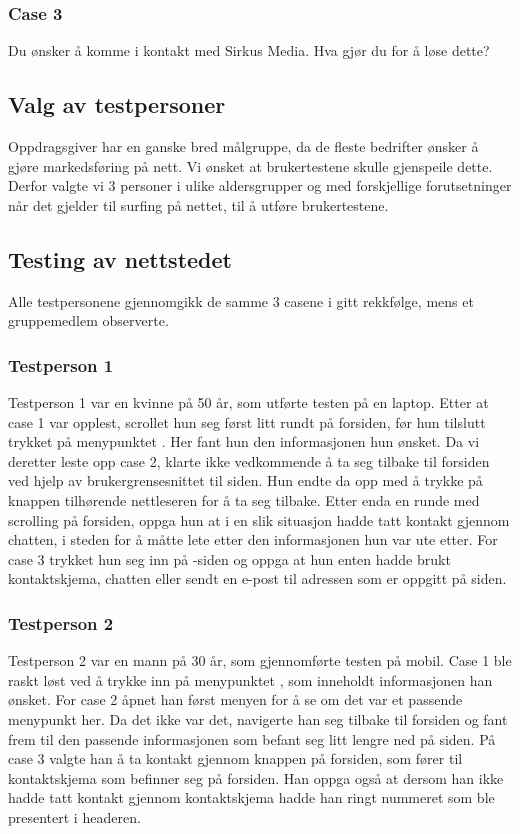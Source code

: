 \subsubsection{Case 3}
Du ønsker å komme i kontakt med Sirkus Media. Hva gjør du for å løse dette?

\subsection{Valg av testpersoner }
Oppdragsgiver har en ganske bred målgruppe, da de fleste bedrifter ønsker å gjøre markedsføring på nett. Vi ønsket at brukertestene skulle gjenspeile dette. Derfor valgte vi 3 personer i ulike aldersgrupper og med forskjellige forutsetninger når det gjelder til surfing på nettet, til å utføre brukertestene.

\subsection{Testing av nettstedet}
Alle testpersonene gjennomgikk de samme 3 casene i gitt rekkfølge, mens et gruppemedlem observerte.

\subsubsection{Testperson 1}
Testperson 1 var en kvinne på 50 år, som utførte testen på en laptop. Etter at case 1 var opplest, scrollet hun seg først litt rundt på forsiden, før hun tilslutt trykket på menypunktet . Her fant hun den informasjonen hun ønsket. Da vi deretter leste opp case 2, klarte ikke vedkommende å ta seg tilbake til forsiden ved hjelp av brukergrensesnittet til siden. Hun endte da opp med å trykke på knappen tilhørende nettleseren for å ta seg tilbake. Etter enda en runde med scrolling på forsiden, oppga hun at i en slik situasjon hadde tatt kontakt gjennom chatten, i steden for å måtte lete etter den informasjonen hun var ute etter. For case 3 trykket hun seg inn på -siden og oppga at hun enten hadde brukt kontaktskjema, chatten eller sendt en e-post til adressen som er oppgitt på siden.

\subsubsection{Testperson 2}
Testperson 2 var en mann på 30 år, som gjennomførte testen på mobil. Case 1 ble raskt løst ved å trykke inn på menypunktet , som inneholdt informasjonen han ønsket. For case 2 åpnet han først menyen for å se om det var et passende menypunkt her. Da det ikke var det, navigerte han seg tilbake til forsiden og fant frem til den passende informasjonen som befant seg litt lengre ned på siden. På case 3 valgte han å ta kontakt gjennom knappen på forsiden, som fører til kontaktskjema som befinner seg på forsiden. Han oppga også at dersom han ikke hadde tatt kontakt gjennom kontaktskjema hadde han ringt nummeret som ble presentert i headeren. 

